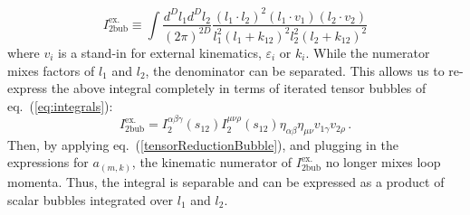 \documentclass[11pt,letter]{article}
\def\eqn#1{eq.~(\ref{#1})}
\begin{document}
\begin{equation}
\label{intg2bub}
I^{\text{ex}.}_{\text{2bub}} \equiv \int \frac{d^D l_{1}d^D l_{2}}{(2\pi)^{2D}} \frac{(l_1\!\cdot\! l_2)^2(l_1\!\cdot\! v_1)(l_2\!\cdot\! v_2)}{l_1^2(l_1+k_{12})^2 l_2^2(l_2+k_{12})^2}
\end{equation}
where $v_i$ is a stand-in for external kinematics, $\varepsilon_i$ or $k_i$. While the numerator mixes factors of $l_1$ and $l_2$, the denominator can be separated. This allows us to re-express the above integral completely in terms of iterated tensor bubbles of \eqn{eq:integrals}:
\begin{equation}
I^{\text{ex}.}_{\text{2bub}} = I_{2}^{\alpha\beta\gamma}(s_{12}) I_2^{\mu\nu\rho}(s_{12})\eta_{\alpha\beta}\eta_{\mu\nu}v_{1 \gamma}v_{2 \rho}\,.
\end{equation}
Then, by applying \eqn{tensorReductionBubble}, and plugging in the expressions for $a_{(m,k)}$, the kinematic numerator of $I^{\text{ex}.}_{\text{2bub}}$ no longer mixes loop momenta. Thus, the integral is separable and can be expressed as a product of scalar bubbles integrated over $l_1$ and $l_2$. 
\end{document}
